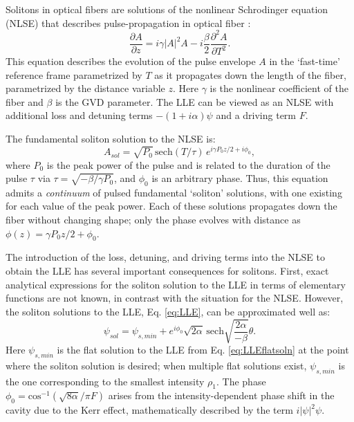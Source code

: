 {Solitons in optical fibers are solutions of the nonlinear Schrodinger equation (NLSE) that describes pulse-propagation in optical fiber \cite{Agrawal2007}:
\begin{equation}
\frac{\partial A}{\partial z}= i\gamma|A|^2 A -i \frac{\beta}{2} \frac{\partial^2 A}{\partial T^2}. \label{NLSE}
\end{equation}
This equation describes the evolution of the pulse envelope $A$ in the `fast-time' reference frame parametrized by $T$ as it propagates down the length of the fiber, parametrized by the distance variable $z$. Here $\gamma$ is the nonlinear coefficient of the fiber and $\beta$ is the GVD parameter. The LLE can be viewed as an NLSE with additional loss and detuning terms $-(1+i\alpha)\psi$ and a driving term $F$.

The fundamental soliton solution to the NLSE is:
\begin{equation}
A_{sol}=\sqrt{P_0}\, \mathrm{sech}\left(T/\tau\right)\,e^{i\gamma P_0 z/2+i\phi_0},
\end{equation}
where $P_0$ is the peak power of the pulse and is related to the duration of the pulse $\tau$ via $\tau=\sqrt{-\beta/\gamma P_0}$, and $\phi_0$ is an arbitrary phase. Thus, this equation admits a \textit{continuum} of pulsed fundamental `soliton' solutions, with one existing for each value of the peak power. Each of these solutions propagates down the fiber without changing shape; only the phase evolves with distance as $\phi(z)=\gamma P_0 z/2+\phi_0$.


The introduction of the loss, detuning, and driving terms into the NLSE to obtain the LLE has several important consequences for solitons. First, exact analytical expressions for the soliton solution to the LLE in terms of elementary functions are not known, in contrast with the situation for the NLSE. However, the soliton solutions to the LLE, Eq. \ref{eq:LLE}, can be approximated well as:
\begin{equation}
\psi_{sol}=\psi_{s,min}+e^{i\phi_0}\sqrt{2\alpha}\,\mathrm{sech}\sqrt{\frac{2\alpha}{-\beta}}\theta. \label{eq:LLEsoliton}
\end{equation}
Here $\psi_{s,min}$ is the flat solution to the LLE from Eq. \ref{eq:LLEflatsoln} at the point where the soliton solution is desired; when multiple flat solutions exist, $\psi_{s,min}$ is the one corresponding to the smallest intensity $\rho_1$. The phase $\phi_0=\mathrm{cos}^{-1}(\sqrt{8\alpha}/\pi F)$ arises from the intensity-dependent phase shift in the cavity due to the Kerr effect, mathematically described by the term $i|\psi|^2\psi$. 

}
